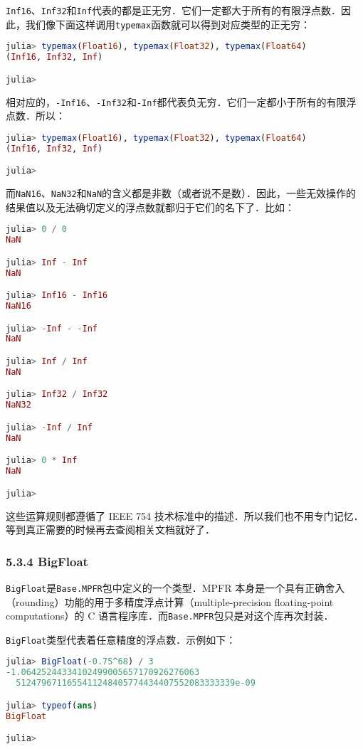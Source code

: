 \verb|Inf16|、\verb|Inf32|和\verb|Inf|代表的都是正无穷．它们一定都大于所有的有限浮点数．因此，我们像下面这样调用\verb|typemax|函数就可以得到对应类型的正无穷：
\begin{lstlisting}[language=julia]
julia> typemax(Float16), typemax(Float32), typemax(Float64)
(Inf16, Inf32, Inf)

julia> 
\end{lstlisting}

相对应的，\verb|-Inf16|、\verb|-Inf32|和\verb|-Inf|都代表负无穷．它们一定都小于所有的有限浮点数．所以：
\begin{lstlisting}[language=julia]
julia> typemax(Float16), typemax(Float32), typemax(Float64)
(Inf16, Inf32, Inf)

julia> 
\end{lstlisting}

而\verb|NaN16|、\verb|NaN32|和\verb|NaN|的含义都是非数（或者说不是数）．因此，一些无效操作的结果值以及无法确切定义的浮点数就都归于它们的名下了．比如：
\begin{lstlisting}[language=julia]
julia> 0 / 0
NaN

julia> Inf - Inf
NaN

julia> Inf16 - Inf16
NaN16

julia> -Inf - -Inf
NaN

julia> Inf / Inf
NaN

julia> Inf32 / Inf32
NaN32

julia> -Inf / Inf
NaN

julia> 0 * Inf
NaN

julia> 
\end{lstlisting}

这些运算规则都遵循了 IEEE 754 技术标准中的描述．所以我们也不用专门记忆．等到真正需要的时候再去查阅相关文档就好了．

\subsubsection{5.3.4 BigFloat}

\verb|BigFloat|是\verb|Base.MPFR|包中定义的一个类型．MPFR 本身是一个具有正确舍入（rounding）功能的用于多精度浮点计算（multiple-precision floating-point computations）的 C 语言程序库．而\verb|Base.MPFR|包只是对这个库再次封装．

\verb|BigFloat|类型代表着任意精度的浮点数．示例如下：
\begin{lstlisting}[language=julia]
julia> BigFloat(-0.75^68) / 3
-1.06425244334102499005657170926276063
  5124796711655411248405774434407552083333339e-09

julia> typeof(ans)
BigFloat

julia> 
\end{lstlisting}

